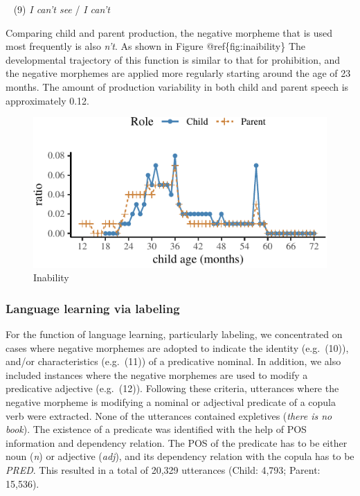 \documentclass[10pt, letterpaper]{article}
\newenvironment{CodeChunk}{}{}
\begin{document}
~ (9) \emph{I can't see} / \emph{I can't}

Comparing child and parent production, the negative morpheme that is
used most frequently is also \emph{n't}. As shown in Figure
@ref\{fig:inaibility\} The developmental trajectory of this function is
similar to that for prohibition, and the negative morphemes are applied
more regularly starting around the age of 23 months. The amount of
production variability in both child and parent speech is approximately
0.12.

\begin{CodeChunk}
\begin{figure}[H]

{\centering \includegraphics{figs/inability-1} 

}

\caption[Inability]{Inability}\label{fig:inability}
\end{figure}
\end{CodeChunk}

\hypertarget{language-learning-via-labeling}{%
\subsubsection{Language learning via
labeling}\label{language-learning-via-labeling}}

For the function of language learning, particularly labeling, we
concentrated on cases where negative morphemes are adopted to indicate
the identity (e.g.~(10)), and/or characteristics (e.g.~(11)) of a
predicative nominal. In addition, we also included instances where the
negative morphemes are used to modify a predicative adjective
(e.g.~(12)). Following these criteria, utterances where the negative
morpheme is modifying a nominal or adjectival predicate of a copula verb
were extracted. None of the utterances contained expletives (\emph{there
is no book}). The existence of a predicate was identified with the help
of POS information and dependency relation. The POS of the predicate has
to be either noun (\emph{n}) or adjective (\emph{adj}), and its
dependency relation with the copula has to be \emph{PRED}. This resulted
in a total of 20,329 utterances (Child: 4,793; Parent: 15,536).
\end{document}
